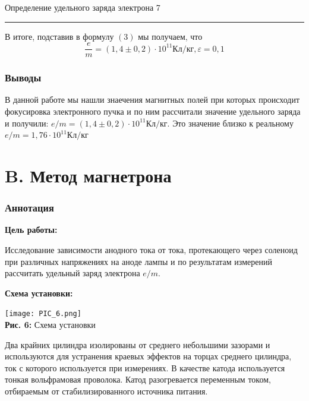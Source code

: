 \documentclass[12pt,a4paper]{scrartcl}
\begin{document}
 	\newpage
	
	\begin{flushleft}
		\footnotesize{Определение удельного заряда электрона} \hspace{\fill} \footnotesize{7}
		\\[-0.3cm]\noindent\rule{\textwidth}{0.3pt}
	\end{flushleft} 

 В итоге, подставив в формулу $(3)$ мы получаем, что 
\[\dfrac{e}{m} = \left(1,4 \pm 0,2\right) \cdot 10^{11} \text{Кл}/\text{кг}, \varepsilon = 0,1\]  
  
\section{Выводы}  
  
В данной работе мы нашли знаечения магнитных полей при которых происходит фокусировка электронного пучка и по ним рассчитали значение удельного заряда и получили: $e/m = (1,4 \pm 0,2) \cdot 10^{11} \text{Кл}/\text{кг}$. Это значение  близко к реальному $e/m = 1,76 \cdot 10^{11} \text{Кл}/\text{кг}$

	\part*{B. Метод магнетрона}	
	\setcounter{section}{0}
	\section{Аннотация}
	
		\textbf{Цель работы: }
	
Исследование зависимости анодного тока от тока, протекающего через соленоид при различных напряжениях на аноде лампы и по результатам измерений рассчитать удельный заряд электрона $e/m$.	
	
	\textbf{Схема установки:}
	\begin{center}
		\texttt{[image: PIC\_6.png]}
		\\\textbf{Рис. 6:} Схема установки
	\end{center}
	
		Два крайних цилиндра изолированы от среднего небольшими зазорами и используются для устранения краевых эффектов на торцах среднего цилиндра, ток с которого используется при измерениях. В качестве катода используется тонкая вольфрамовая проволока. Катод разогревается переменным током, отбираемым от стабилизированного источника питания. 
\end{document}
